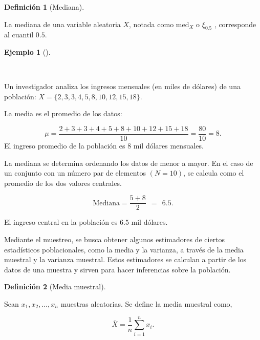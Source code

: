 \documentclass[
  us-letterpaper,
]{scrreprt}
\theoremstyle{plain}
\theoremstyle{definition}
\newtheorem{definition}{Definición}[chapter]
\theoremstyle{definition}
\newtheorem{example}{Ejemplo}[chapter]
\theoremstyle{remark}
\begin{document}
\begin{definition}[Mediana]\protect\hypertarget{def-mediana}{}\label{def-mediana}

La mediana de una variable aleatoria \(X\), notada como \(\text{med}_X\)
o \(\xi_{0.5}\) , corresponde al cuantil \(0.5\).

\end{definition}

\begin{example}[]\protect\hypertarget{exm-IM}{}\label{exm-IM}

~

\begin{tcolorbox}[enhanced jigsaw, colback=white, toptitle=1mm, arc=.35mm, rightrule=.15mm, left=2mm, colframe=quarto-callout-caution-color-frame, breakable, leftrule=.75mm, colbacktitle=quarto-callout-caution-color!10!white, coltitle=black, opacityback=0, bottomtitle=1mm, bottomrule=.15mm, titlerule=0mm, opacitybacktitle=0.6, toprule=.15mm, title={\textbf{Ingresos mensuales}}]

Un investigador analiza los ingresos mensuales (en miles de dólares) de
una población: \(X=\{2,3,3,4,5,8,10,12,15,18\}\).

La media es el promedio de los datos:

\[\mu  = \dfrac{2 + 3 + 3 + 4 + 5 + 8 + 10 +12 + 15 + 18}{10} = \dfrac{80}{10} = 8.\]
El ingreso promedio de la población es 8 mil dólares mensuales.

La mediana se determina ordenando los datos de menor a mayor. En el caso
de un conjunto con un número par de elementos \((N=10)\), se calcula
como el promedio de los dos valores centrales.

\[\text{Mediana} = \dfrac{5 + 8}{2} \ \ = \ \ 6.5.\]

El ingreso central en la población es \(6.5\) mil dólares.

\end{tcolorbox}

\end{example}

Mediante el muestreo, se busca obtener algunos estimadores de ciertos
estadísticos poblacionales, como la media y la varianza, a través de la
media muestral y la varianza muestral. Estos estimadores se calculan a
partir de los datos de una muestra y sirven para hacer inferencias sobre
la población.

\begin{definition}[Media
muestral]\protect\hypertarget{def-mediam}{}\label{def-mediam}

Sean \(x_1,x_2, \dots, x_n\) muestras aleatorias. Se define la media
muestral como,

\[ \bar{X}  =\frac{1}{n}\sum_{i=1}^n x_i. \]

\end{definition}
\end{document}
